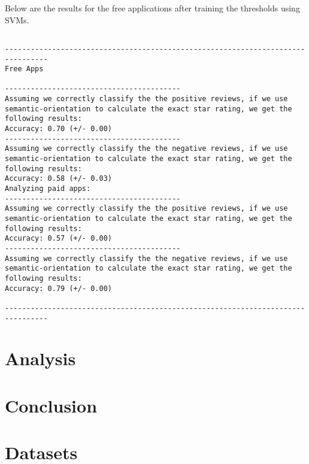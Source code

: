 \documentclass[11pt]{report} %
\begin{document}
Below are the results for the free applications after training the thresholds using SVMs.

\begin{verbatim}

--------------------------------------------------------------------------------
Free Apps

-----------------------------------------
Assuming we correctly classify the the positive reviews, if we use semantic-orientation to calculate the exact star rating, we get the following results:
Accuracy: 0.70 (+/- 0.00)
-----------------------------------------
Assuming we correctly classify the the negative reviews, if we use semantic-orientation to calculate the exact star rating, we get the following results:
Accuracy: 0.58 (+/- 0.03)
Analyzing paid apps:
-----------------------------------------
Assuming we correctly classify the the positive reviews, if we use semantic-orientation to calculate the exact star rating, we get the following results:
Accuracy: 0.57 (+/- 0.00)
-----------------------------------------
Assuming we correctly classify the the negative reviews, if we use semantic-orientation to calculate the exact star rating, we get the following results:
Accuracy: 0.79 (+/- 0.00)

--------------------------------------------------------------------------------
\end{verbatim}

\chapter{Analysis}

\chapter{Conclusion}

\appendix
\chapter{Datasets}




\end{document}
